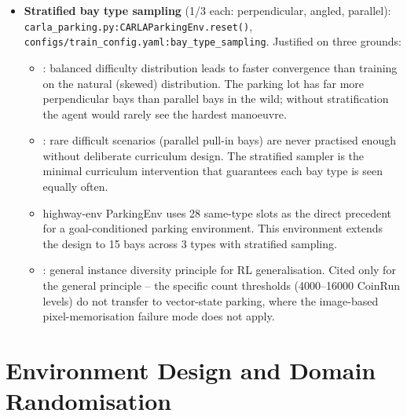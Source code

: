 \documentclass[11pt,a4paper]{article}
\begin{document}
\begin{itemize}[leftmargin=*]
  \item \textbf{Stratified bay type sampling} (1/3 each: perpendicular, angled, parallel):
        \texttt{carla\_parking.py:CARLAParkingEnv.reset()},
        \texttt{configs/train\_config.yaml:bay\_type\_sampling}.
        Justified on three grounds:
        \begin{itemize}
          \item \cite{bengio2009curriculum}: balanced difficulty distribution leads to
                faster convergence than training on the natural (skewed) distribution.
                The parking lot has far more perpendicular bays than parallel bays
                in the wild; without stratification the agent would rarely see the
                hardest manoeuvre.
          \item \cite{florensa2017reverse}: rare difficult scenarios (parallel pull-in bays)
                are never practised enough without deliberate curriculum design. The
                stratified sampler is the minimal curriculum intervention that guarantees
                each bay type is seen equally often.
          \item \cite{leurent2018highway} highway-env ParkingEnv uses 28 same-type slots
                as the direct precedent for a goal-conditioned parking environment.
                This environment extends the design to 15 bays across 3 types with
                stratified sampling.
          \item \cite{cobbe2019quantifying}: general instance diversity principle for RL
                generalisation. Cited only for the general principle -- the specific
                count thresholds (4000--16000 CoinRun levels) do not transfer to
                vector-state parking, where the image-based pixel-memorisation failure
                mode does not apply.
        \end{itemize}
\end{itemize}

\section{Environment Design and Domain Randomisation}
\end{document}
